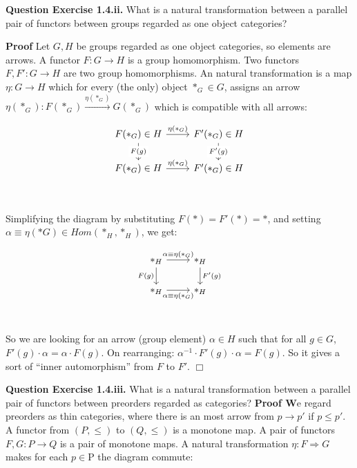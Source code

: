 \documentclass[11pt]{report}
\newcommand{\nt}{\Rightarrow}
\def\qed{$\Box$}
\newcommand*{\question}[1]{\leavevmode\newline \textbf{Question #1.}}
\newcommand*{\proof}[1]{\leavevmode\newline \textbf{Proof #1}}
\begin{document}
\question{Exercise 1.4.ii} What is a natural transformation between a parallel pair of functors between groups regarded as one object categories?

\proof{} Let $G, H$ be groups regarded as one object categories, so elements are arrows. A functor $F: G \rightarrow H$ is a group homomorphism. Two functors $F, F': G \rightarrow H$
are two group homomorphisms. An natural transformation is a map $\eta: G \rightarrow H$ which for every (the only) object $*_G \in G$, assigns
an arrow $\eta(*_G): F(*_G) \xrightarrow{\eta(*_G)} G(*_G)$ which is compatible with all arrows:

\[\begin{tikzcd}
	{F(*_G) \in H} & {F'(*_G) \in H} \\
	{F(*_G) \in H} & {F'(*_G) \in H} \\
	& {}
	\arrow["{\eta(*_G)}", from=1-1, to=1-2]
	\arrow["{\eta(*_G)}", from=2-1, to=2-2]
	\arrow["{F(g)}"{description}, from=1-1, to=2-1]
	\arrow["{F'(g)}"{description}, from=1-2, to=2-2]
\end{tikzcd}\]

Simplifying the diagram by substituting $F(*) = F'(*) = *$, and setting $\alpha \equiv \eta(*G) \in Hom(*_H, *_H)$, we get:

\[\begin{tikzcd}
	{*_H} & {*_H} \\
	{*_H} & {*_H} \\
	& {}
	\arrow["{\alpha \equiv \eta(*_G)}", from=1-1, to=1-2]
	\arrow["{\alpha \equiv \eta(*_G)}"', from=2-1, to=2-2]
	\arrow["{F'(g)}", from=1-2, to=2-2]
	\arrow["{F(g)}"', from=1-1, to=2-1]
\end{tikzcd}\]

So we are looking for an arrow (group element) $\alpha \in H$ such that for all $g \in G$, $F'(g) \cdot \alpha = \alpha \cdot F(g)$.
On rearranging: $\alpha^{-1} \cdot F'(g) \cdot \alpha = F(g)$. So it gives a sort of  ``inner automorphism'' from $F$ to $F'$. \qed


\question{Exercise 1.4.iii} What is a natural transformation between a parallel pair of functors between preorders regarded as categories?
\proof We regard preorders as thin categories, where there is an most arrow from $p \rightarrow p'$ if $p \leq p'$. A functor from $(P, \leq)$ to $(Q, \leq)$
is a monotone map. A pair of functors $F, G: P \rightarrow Q $ is a pair of monotone maps. A natural transformation $\eta: F \nt G$ makes for each $p \in $P
the diagram commute:
\end{document}
